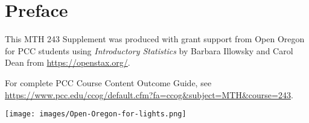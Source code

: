 \chapter{Preface}


This MTH 243 Supplement was produced with grant support from 
Open Oregon 
for PCC students using 
\emph{Introductory Statistics} 
by Barbara Illowsky and Carol Dean
from
\url{https://openstax.org/}.

For complete PCC Course Content Outcome Guide, see \url{https://www.pcc.edu/ccog/default.cfm?fa=ccog&subject=MTH&course=243}.

\begin{center}
\texttt{[image: images/Open-Oregon-for-lights.png]}
\end{center}
